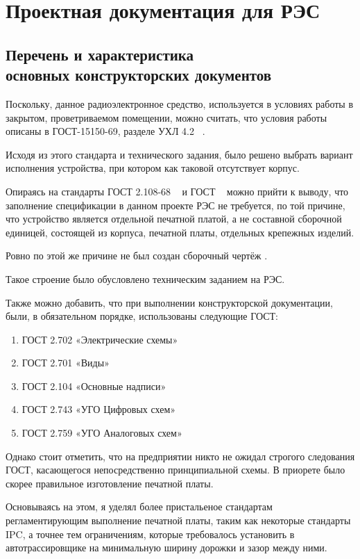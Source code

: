 \section{Проектная документация для РЭС}

\subsection{Перечень и характеристика\\
  основных конструкторских документов}

Поскольку,
данное радиоэлектронное средство,
используется в условиях работы в закрытом, проветриваемом помещении,
можно считать, что условия работы описаны в ГОСТ-15150-69,
разделе УХЛ 4.2 ~\cite{GOST-15150-69}.

Исходя из этого стандарта и технического задания,
было решено выбрать вариант исполнения устройства,
при котором как таковой отсутствует корпус.

Опираясь на стандарты ГОСТ 2.108-68 ~\cite{GOST-spec}
и ГОСТ ~\cite{GOST-2-702-211} можно прийти к выводу,
что заполнение спецификации в данном проекте РЭС не требуется,
по той причине, что устройство является отдельной печатной платой,
а не составной сборочной единицей,
состоящей из корпуса, печатной платы,
отдельных крепежных изделий.

Ровно по этой же причине не был создан сборочный чертёж .

Такое строение было обусловлено техническим заданием на РЭС.

Также можно добавить, что при выполнении конструкторской документации,
были, в обязательном порядке, использованы следующие ГОСТ:
\begin{enumerate}
\item ГОСТ 2.702 «Электрические схемы»  
\item ГОСТ 2.701 «Виды»                 
\item ГОСТ 2.104 «Основные надписи»     
\item ГОСТ 2.743 «УГО Цифровых схем»    
\item ГОСТ 2.759 «УГО Аналоговых схем»  
\end{enumerate}

Однако стоит отметить, что на предприятии никто не ожидал
строгого следования ГОСТ, касающегося непосредственно
принципиальной схемы. В приорете было скорее правильное изготовление печатной платы.

Основываясь на этом,
я уделял более пристальеное стандартам регламентирующим
выполнение печатной платы, таким как некоторые стандарты IPC,
а точнее тем ограничениям, которые требовалось установить в
автотрассировщике на минимальную ширину дорожки и зазор между ними.

